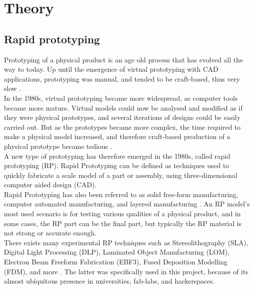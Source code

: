 \section{Theory}
\subsection{Rapid prototyping}


Prototyping of a physical product is an age old process that has evolved all the way to today. Up until the emergence of virtual prototyping with CAD applications, prototyping was manual, and tended to be craft-based, thus very slow \cite{chua2010}. \\
In the 1980s, virtual prototyping became more widespread, as computer tools became more mature. Virtual models could now be analysed and modified as if they were physical prototypes, and several iterations of designs could be easily carried out. But as the prototypes became more complex, the time required to make a physical model increased, and therefore craft-based production of a physical prototype became tedious \cite{chua2010}. \\

A new type of prototyping has therefore emerged in the 1980s, called rapid prototyping (RP). Rapid Prototyping can be defined as techniques used to quickly fabricate a scale model of a part or assembly, using three-dimensional computer aided design (CAD). \\

Rapid Prototyping has also been referred to as solid free-form manufacturing, computer automated manufacturing, and layered manufacturing \cite{efunda}. An RP model's most used scenario is for testing various qualities of a physical product, and in some cases, the RP part can be the final part, but typically the RP material is not strong or accurate enough. \\

There exists many experimental RP techniques such as Stereolithography (SLA), Digital Light Processing (DLP), Laminated Object Manufacturing (LOM), Electron Beam Freeform Fabrication (EBF3), Fused Deposition Modelling (FDM), and more \cite{wiki3D}. The latter was specifically used in this project, because of its almost ubiquitous presence in universities, fab-labs, and hackerspaces. \\

